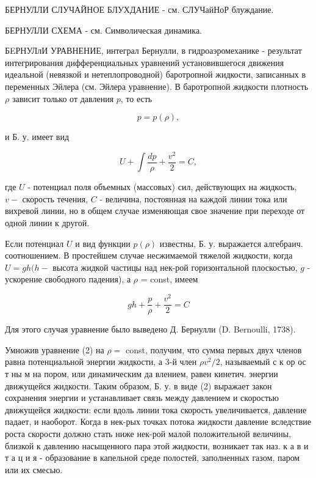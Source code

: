 \documentclass[10pt]{article}
\begin{document}
БЕРНУЛЛИ СЛУЧАЙНОЕ БЛУХДАНИЕ - см. СЛУЧайНоР блуждание.



БЕРНУЛЛИ СХЕМА - см. Символическая динамика.



БEРНУЛлИ УРАВНЕНИЕ, интеграл Бернулли, в гидроаэромеханике - результат интегрирования дифференциальных уравнений установившегося движения идеальной (невязкой и нетеплопроводной) баротропной жидкости, записанных в переменных Эйлера (см. Эйлера уравнение). В баротропной жидкости плотность $\rho$ зависит только от давления $p$, то есть



\[

p=p(\rho),

\]



и Б. у. имеет вид



\[

U+\int \frac{d p}{\rho}+\frac{v^{2}}{2}=C,

\]



где $U$ - потенциал поля объемных (массовых) сил, действующих на жидкость, $v-$ скорость течения, $C$ - величина, постоянная на каждой линии тока или вихревой линии, но в общем случае изменяющая свое значение при переходе от одной линии к другой.



Если потенциал $U$ и вид функции $p(\rho)$ известны, Б. у. выражается алгебраич. соотношением. В простейшем случае несжимаемой тяжелой жидкости, когда $U=g h(h-$ высота жидкой частицы над нек-рой горизонтальной плоскостью, $g$ - ускорение свободного падения), а $\rho$ = const, имеем



\[

g h+\frac{p}{\rho}+\frac{v^{2}}{2}=C

\]



Для этого случая уравнение было выведено Д. Бернулли (D. Bernoulli, 1738).



Умножив уравнение (2) на $\rho=$ const, получим, что сумма первых двух членов равна потенциальной энергии жидкости, а 3-й член $\rho v^{2} / 2$, называемый с к ор ос т ны м на пором, или динамическим да влением, равен кинетич. энергии движущейся жидкости. Таким образом, Б. у. в виде (2) выражает закон сохранения энергии и устанавливает связь между давлением и скоростью движущейся жидкости: если вдоль линии тока скорость увеличивается, давление падает, и наоборот. Когда в нек-рых точках потока жидкости давление вследствие роста скорости должно стать ниже нек-рой малой положительной величины, близкой к давлению насыщенного пара этой жидкости, возникает так наз. к а в и т а ц и я - образование в капельной среде полостей, заполненных газом, паром или их смесью.
\end{document}
